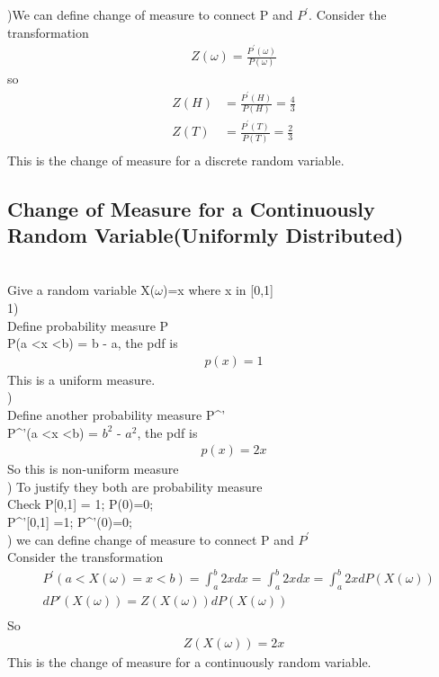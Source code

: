 \documentclass[a4paper]{article}
\begin{document}
)We can define change of measure to connect P and $P^{'}$. Consider the transformation 
\begin{align*}
	Z(\omega) = \frac{P^{'}(\omega)}{P(\omega)}
\end{align*}
so 
\begin{align*}
	Z(H) & = \frac{P^{'}(H)}{P(H)} = \frac{4}{3}\\
	Z(T) & = \frac{P^{'}(T)}{P(T)} = \frac{2}{3}\\
\end{align*}
This is the change of measure for a discrete random variable. \\
\subsection{Change of Measure for a Continuously Random Variable(Uniformly Distributed) } \\

Give a random variable  X($\omega$)=x where x in [0,1]\\
1)	\\
Define probability measure P \\
P(a \textless x \textless b) = b - a, the pdf is 
\begin{align*}
p(x) = 1	
\end{align*}
This is a uniform measure.\\

)\\
Define another probability measure P^{'}\\
P^{'}(a \textless x  \textless b) = $b^2$ - $a^2$, the pdf is 
\begin{align*}
p(x) = 2x
\end{align*}
So this is non-uniform measure\\


)	To justify they both are probability measure\\
Check  P[0,1] = 1; P(0)=0;\\
       P^{'}[0,1] =1; P^{'}(0)=0;\\


) we can define change of measure to connect P and $P^{'}$ \\
Consider the transformation \\
\begin{align*}
	&P^{'}(a < X(\omega) = x < b) = \int _a ^b 2x dx = \int _a ^b 2x dx = \int_a ^b 2x dP(X(\omega))\\
	&dP{'}(X(\omega)) = Z(X(\omega)) dP(X(\omega)) \\
\end{align*}
So
\begin{align*}
	Z(X(\omega))= 2x
\end{align*}
This is the change of measure for a continuously random variable. \\
\end{document}
